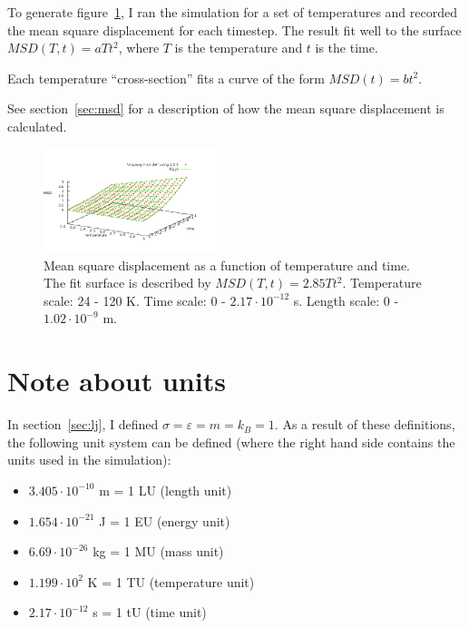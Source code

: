 \documentclass[twocolumn]{revtex4}
\begin{document}
To generate figure~\ref{fig:avg-msd}, I ran the simulation for a set of temperatures and recorded the mean square displacement for each timestep. The result fit well to the surface $MSD(T,t)=aTt^2$, where $T$ is the temperature and $t$ is the time.

Each temperature ``cross-section'' fits a curve of the form $MSD(t)=bt^2$.

See section~\ref{sec:msd} for a description of how the mean square displacement is calculated.

\begin{figure}[htb]
\begin{center}
\leavevmode
\includegraphics[width=0.45\textwidth]{avg-msd.png}
\end{center}
\caption{Mean square displacement as a function of temperature and time. The fit surface is described by $MSD(T,t)=2.85 T t^2$. Temperature scale: 24 - 120 K. Time scale: 0 - $2.17\cdot10^{-12}$ s. Length scale: 0 - $1.02\cdot10^{-9}$ m.}
\label{fig:avg-msd}
\end{figure}

\section{Note about units}

In section~\ref{sec:lj}, I defined $\sigma = \varepsilon = m = k_B = 1$. As a result of these definitions, the following unit system can be defined (where the right hand side contains the units used in the simulation):

\begin{itemize}
\item $3.405\cdot10^{-10}$ m = 1 LU (length unit)
\item $1.654\cdot10^{-21}$ J = 1 EU (energy unit)
\item $6.69\cdot10^{-26}$ kg = 1 MU (mass unit)
\item $1.199\cdot10^2$ K = 1 TU (temperature unit)
\item $2.17\cdot10^{-12}$ s = 1 tU (time unit)
\end{itemize}
\end{document}
